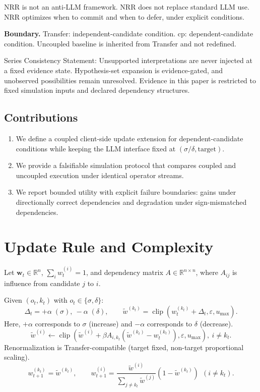 \documentclass[11pt,a4paper]{article}
\begin{document}
NRR is not an anti-LLM framework.
NRR does not replace standard LLM use.
NRR optimizes when to commit and when to defer, under explicit conditions.

\textbf{Boundary.}
Transfer: independent-candidate condition.
cp: dependent-candidate condition.
Uncoupled baseline is inherited from Transfer and not redefined.

Series Consistency Statement: Unsupported interpretations are never injected at a fixed evidence state. Hypothesis-set expansion is evidence-gated, and unobserved possibilities remain unresolved. Evidence in this paper is restricted to fixed simulation inputs and declared dependency structures.

\subsection{Contributions}
\begin{enumerate}
  \item We define a coupled client-side update extension for dependent-candidate conditions while keeping the LLM interface fixed at \((\sigma/\delta,\text{target})\).
  \item We provide a falsifiable simulation protocol that compares coupled and uncoupled execution under identical operator streams.
  \item We report bounded utility with explicit failure boundaries: gains under directionally correct dependencies and degradation under sign-mismatched dependencies.
\end{enumerate}

\section{Update Rule and Complexity}
Let \(\mathbf{w}_t\in\mathbb{R}^n\), \(\sum_i w_t^{(i)}=1\), and dependency matrix \(A\in\mathbb{R}^{n\times n}\), where \(A_{ij}\) is influence from candidate \(j\) to \(i\).

Given \((o_t,k_t)\) with \(o_t\in\{\sigma,\delta\}\):
\[
\Delta_t = +\alpha\;(\sigma),\ -\alpha\;(\delta),\qquad
\tilde{w}^{(k_t)}=\operatorname{clip}(w_t^{(k_t)}+\Delta_t,\varepsilon,u_{\max}).
\]
Here, \(+\alpha\) corresponds to \(\sigma\) (increase) and \(-\alpha\) corresponds to \(\delta\) (decrease).
\[
\tilde{w}^{(i)} \leftarrow \operatorname{clip}(\tilde{w}^{(i)}+\beta A_{i,k_t}(\tilde{w}^{(k_t)}-w_t^{(k_t)}),\varepsilon,u_{\max}),\ i\neq k_t.
\]
Renormalization is Transfer-compatible (target fixed, non-target proportional scaling).
\[
w_{t+1}^{(k_t)}=\tilde{w}^{(k_t)},\qquad
w_{t+1}^{(i)}=\frac{\tilde{w}^{(i)}}{\sum_{j\neq k_t}\tilde{w}^{(j)}}\left(1-\tilde{w}^{(k_t)}\right)\ \ (i\neq k_t).
\]
\end{document}
